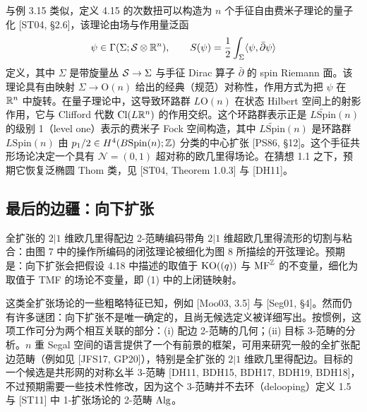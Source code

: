 \begin{example}
与例 3.15 类似，定义 4.15 的次数扭可以构造为 $n$ 个手征自由费米子理论的量子化 [ST04, §2.6]，该理论由场与作用量泛函
\[
\psi\in\Gamma(\Sigma;\mathcal{S}\otimes\mathbb{R}^n),
\qquad
S(\psi)=\frac{1}{2}\int_\Sigma\langle\psi,\bar\partial\psi\rangle
\]
定义，其中 $\Sigma$ 是带旋量丛 $\mathcal{S}\to\Sigma$ 与手征 Dirac 算子 $\bar\partial$ 的 spin Riemann 面。该理论具有由映射 $\Sigma\to\mathrm{O}(n)$ 给出的经典（规范）对称性，作用方式为把 $\psi$ 在 $\mathbb{R}^n$ 中旋转。在量子理论中，这导致环路群 $L\mathrm{O}(n)$ 在状态 Hilbert 空间上的射影作用，它与 Clifford 代数 $\mathrm{Cl}(L\mathbb{R}^n)$ 的作用交织。这个环路群表示正是 $\widetilde{L\mathrm{Spin}}(n)$ 的级别 1（level one）表示的费米子 Fock 空间构造，其中 $\widetilde{L\mathrm{Spin}}(n)$ 是环路群 $L\mathrm{Spin}(n)$ 由 $p_1/2\in H^4(B\mathrm{Spin}(n);\mathbb{Z})$ 分类的中心扩张 [PS86, §12]。这个手征共形场论决定一个具有 $\mathcal N=(0,1)$ 超对称的欧几里得场论。在猜想 1.1 之下，预期它恢复泛椭圆 Thom 类，见 [ST04, Theorem 1.0.3] 与 [DH11]。
\end{example}

\subsection{最后的边疆：向下扩张}
全扩张的 $2|1$ 维欧几里得配边 2-范畴编码带角 $2|1$ 维超欧几里得流形的切割与粘合：由图 7 中的操作所编码的闭弦理论被细化为图 8 所描绘的开弦理论。预期是：向下扩张会把假设 4.18 中描述的取值于 $\mathrm{KO}((q))$ 与 $\mathrm{MF}^{\mathbb{Z}}$ 的不变量，细化为取值于 TMF 的场论不变量，即 (1) 中的上闭链映射。

这类全扩张场论的一些粗略特征已知，例如 [Moo03, 3.5] 与 [Seg01, §4]。然而仍有许多谜团：向下扩张不是唯一确定的，且尚无候选定义被详细写出。按惯例，这项工作可分为两个相互关联的部分：(i) 配边 2-范畴的几何；(ii) 目标 3-范畴的分析。$n$ 重 Segal 空间的语言提供了一个有前景的框架，可用来研究一般的全扩张配边范畴（例如见 [JFS17, GP20]），特别是全扩张的 $2|1$ 维欧几里得配边。目标的一个候选是共形网的对称幺半 3-范畴 [DH11, BDH15, BDH17, BDH19, BDH18]，不过预期需要一些技术性修改，因为这个 3-范畴并不去环（delooping）定义 1.5 与 [ST11] 中 1-扩张场论的 2-范畴 $\operatorname{Alg}$。


